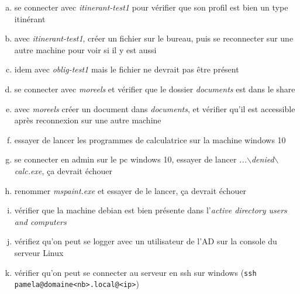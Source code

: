 \documentclass[a4paper]{article}
\begin{document}
\begin{enumerate}[(a)]
    \item se connecter avec \textit{itinerant-test1} pour vérifier que son profil est bien un type itinérant
    \item avec \textit{itinerant-test1}, créer un fichier sur le bureau, puis se reconnecter sur une autre machine pour voir si il y est aussi
    \item idem avec \textit{oblig-test1} mais le fichier ne devrait pas être présent
    \item se connecter avec \textit{moreels} et vérifier que le dossier \textit{documents} est dans le share
    \item avec \textit{moreels} créer un document dans \textit{documents}, et vérifier qu'il est accessible après reconnexion sur une autre machine
    \item essayer de lancer les programmes de calculatrice sur la machine windows 10
    \item se connecter en admin sur le pc windows 10, essayer de lancer \textit{...$\backslash$denied$\backslash$calc.exe}, ça devrait échouer
    \item renommer \textit{mspaint.exe} et essayer de le lancer, ça devrait échouer
    \item vérifier que la machine debian est bien présente dans l'\textit{active directory users and computers}
    \item vérifiez qu'on peut se logger avec un utilisateur de l'AD sur la console du serveur Linux
    \item vérifier qu'on peut se connecter au serveur en ssh sur windows (\texttt{ssh pamela@domaine<nb>.local@<ip>})
\end{enumerate}




















\appendix \newpage
\end{document}
